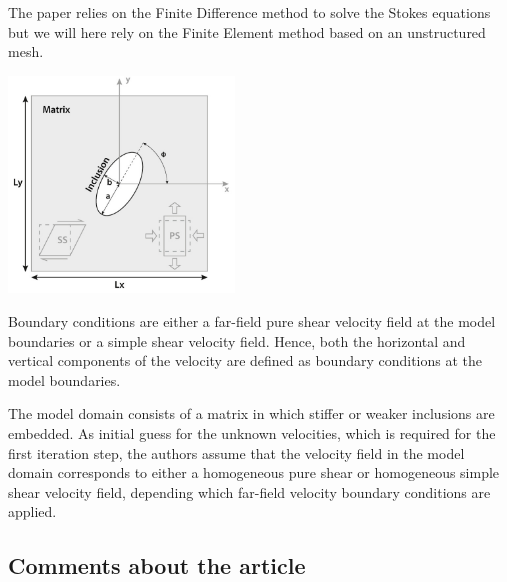 The paper relies on the Finite Difference method to solve the Stokes equations but we will here 
rely on the Finite Element method based on an unstructured mesh.


\begin{center}
\includegraphics[width=6cm]{python_codes/fieldstone_142/images/hams22_a}\\
\end{center}

Boundary conditions are either a far-field pure shear velocity field at the model boundaries
or a simple shear velocity field.
Hence, both the horizontal and vertical components of the velocity are defined as
boundary conditions at the model boundaries.

The model domain consists of a matrix in which stiffer or weaker inclusions are embedded. As
initial guess for the unknown velocities, which is required for the first
iteration step, the authors assume that the velocity field in the model domain
corresponds to either a homogeneous pure shear or homogeneous simple
shear velocity field, depending which far-field velocity boundary conditions are applied. 

\subsection*{Comments about the article}

